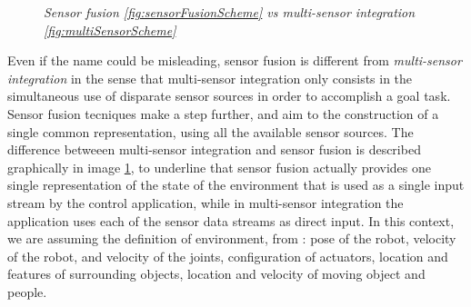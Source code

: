 \begin{figure}
	\centering
	\qquad
	\caption{\textit{Sensor fusion \ref{fig:sensorFusionScheme} vs multi-sensor integration \ref{fig:multiSensorScheme}}}
	\label{fig:fusionVsMultiSensor}
\end{figure}

Even if the name could be misleading, sensor fusion is different from \textit{multi-sensor integration} in the sense that multi-sensor integration only consists in the simultaneous use of disparate sensor sources in order to accomplish a goal task. Sensor fusion tecniques make a step further, and aim to the construction of a single common representation, using all the available sensor sources. The difference betweeen multi-sensor integration and sensor fusion is described graphically in image \ref{fig:fusionVsMultiSensor}, to underline that sensor fusion actually provides one single representation of the state of the environment that is used as a single input stream by the control application, while in multi-sensor integration the application uses each of the sensor data streams as direct input. In this context, we are assuming the definition of environment, from \cite{stateOfEnvironment}: pose of the robot, 	velocity of the robot, and velocity of the joints, configuration of actuators, location and features of surrounding objects, location and velocity of moving object and people.

